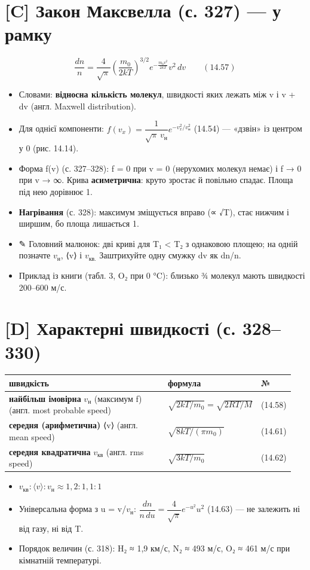 \documentclass[11pt,a4paper,oneside]{book}
\newcommand{\pen}{{\sffamily\color{accent}✎}}
\begin{document}
\section*{[C] Закон Максвелла (с. 327) — у рамку}
\[\frac{dn}{n} = \frac{4}{\sqrt\pi}\left(\frac{m_0}{2kT}\right)^{3/2}e^{-\frac{m_0v^2}{2kT}}v^2\,dv\qquad(14.57)\]
\begin{itemize}
\item Словами: \textbf{відносна кількість молекул}, швидкості яких лежать між v і v + dv (англ. Maxwell distribution).
\item Для однієї компоненти: $f(v_x) = \dfrac{1}{\sqrt\pi\,v_\text{н}}e^{-v_x^2/v_\text{н}^2}$ (14.54) — «дзвін» із центром у 0 (рис. 14.14).
\item Форма f(v) (с. 327–328): f = 0 при v = 0 (нерухомих молекул немає) і f → 0 при v → ∞. Крива \textbf{асиметрична}: круто зростає й повільно спадає. Площа під нею дорівнює 1.
\item \textbf{Нагрівання} (с. 328): максимум зміщується вправо (∝ √T), стає нижчим і ширшим, бо площа лишається 1.
\item \pen{} Головний малюнок: дві криві для T₁ < T₂ з однаковою площею; на одній позначте $v_{\text{н}}$, ⟨v⟩ і $v_{\text{кв}.}$ Заштрихуйте одну смужку dv як dn/n.
\item Приклад із книги (табл. 3, O₂ при 0 °C): близько ¾ молекул мають швидкості 200–600 м/с.
\end{itemize}

\section*{[D] Характерні швидкості (с. 328–330)}
{\small
\begin{longtable}{>{\raggedright\arraybackslash}p{0.565\linewidth}>{\raggedright\arraybackslash}p{0.296\linewidth}>{\raggedright\arraybackslash}p{0.091\linewidth}}
\toprule
\textbf{швидкість} & \textbf{формула} & \textbf{№} \\
\midrule
\endhead
\textbf{найбільш імовірна} $v_{\text{н}}$ (максимум f) (англ. most probable speed) & $\sqrt{2kT/m_0} = \sqrt{2RT/M}$ & (14.58) \\
\textbf{середня (арифметична)} ⟨v⟩ (англ. mean speed) & $\sqrt{8kT/(\pi m_0)}$ & (14.61) \\
\textbf{середня квадратична} $v_{\text{кв}}$ (англ. rms speed) & $\sqrt{3kT/m_0}$ & (14.62) \\
\bottomrule
\end{longtable}
}
\begin{itemize}
\item $v_{\text{кв}} : \langle v\rangle : v_\text{н} \approx 1{,}2 : 1{,}1 : 1$
\item Універсальна форма з u = v/$v_{\text{н}}$: $\dfrac{dn}{n\,du} = \dfrac4{\sqrt\pi}e^{-u^2}u^2$ (14.63) — не залежить ні від газу, ні від T.
\item Порядок величин (с. 318): H₂ ≈ 1,9 км/с, N₂ ≈ 493 м/с, O₂ ≈ 461 м/с при кімнатній температурі.
\end{itemize}
\end{document}
